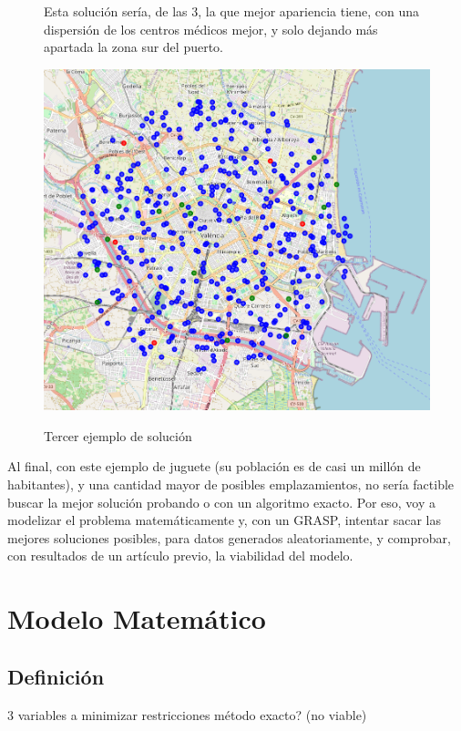 \documentclass[12pt,a4paper]{book}
\begin{document}
\begin{figure}[H]
    \centering
    \begin{minipage}[c]{0.45\textwidth}
        Esta solución sería, de las 3, la que mejor apariencia tiene, con una dispersión de los centros médicos mejor, y solo dejando más apartada la zona sur del puerto.
    \end{minipage}
    \hfill
    \begin{minipage}[c]{0.45\textwidth}
        \includegraphics[width=\textwidth]{images/solucion_ejemplo_3.png}
        \label{fig:ejemplo_3}
    \end{minipage}
    \caption{Tercer ejemplo de solución}
\end{figure}

 Al final, con este ejemplo de juguete (su población es de casi un millón de habitantes), y una cantidad mayor de posibles emplazamientos, no sería factible buscar la mejor solución probando
 o con un algoritmo exacto. Por eso, voy a modelizar el problema matemáticamente y, con un GRASP, intentar sacar las mejores soluciones posibles, para datos generados aleatoriamente, y comprobar, 
 con resultados de un artículo previo, la viabilidad del modelo.

\chapter{Modelo Matemático}

\section{Definición}
3 variables a minimizar
restricciones
método exacto? (no viable)
\end{document}
